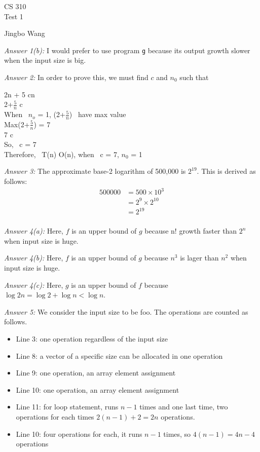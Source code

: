 \documentclass[11pt]{article}
\newcommand{\name}{Jingbo Wang} %
\newcommand{\answer}[1]{\vspace*{2ex}\textit{Answer #1: } }
\begin{document}
\thispagestyle{empty}

\begin{center}
{\large CS 310}\\
Test 1\\
\end{center}

\begin{flushright}
\name{}
\end{flushright}

\answer{1(b)} I would prefer to use program \verb.g. because its
output growth slower when the input size is big.

\answer{2} In order to prove this, we must find $c$ and $n_0$ such that
 
\begin{center}
    2n + 5 \leq cn\\
   2+$\frac{5}{n}$ \leq c \\
   When \ $n_o$ = 1, (2+$\frac{5}{n}$) \ have max value \\
   Max(2+$\frac{5}{n}$) = 7 \\
   7 \leq c\\
   So, \ c = 7\\
   Therefore, \ T(n) \in O(n), when \ c = 7, $n_0$ = 1 \\
\end{center}

\answer{3} The approximate base-2 logarithm of 500,000 is $2^{19}$.  This
is derived as follows:
\begin{align*}
    500000 &= 500 \times 10^3 \\
           &= 2^9 \times 2^{10} \\
           &= 2^{19} \\
\end{align*}

\answer{4(a)} Here, $f$ is an upper bound of $g$ because n! growth faster 
than $2^n$ when input size is huge.

\answer{4(b)} Here, $f$ is an upper bound of $g$ because $n^3$ is 
lager than $n^2$ when input size is huge.

\answer{4(c)} Here, $g$ is an upper bound of $f$ because $\log 2n = 
\log 2 + \log n < \log n$.

\answer{5} We consider the input size to be foo.  The operations are
counted as follows.

\begin{itemize}
\item Line 3: one operation regardless of the input size
\item Line 8: a vector of a specific size can be allocated in one
  operation
\item Line 9: one operation, an array element assignment
\item Line 10: one operation, an array element assignment
\item Line 11: for loop statement, runs $n - 1$ times and one last 
               time, two operations for each times $2(n - 1) + 2 
               = 2n$ operations.
\item Line 10: four operations for each, it runs $n - 1$ times, so 
             $4(n-1) =4n - 4$ operations

\end{itemize}
\end{document}
